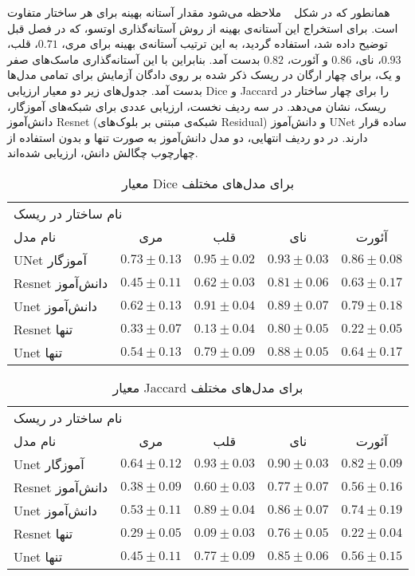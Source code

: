 همانطور که در شکل ~ ملاحظه‌ می‌شود مقدار آستانه بهینه برای هر ساختار متفاوت است. برای استخراج این آستانه‌ی بهینه از روش آستانه‌گذاری اوتسو، که در فصل قبل توضیح داده شد، استفاده گردید، به این ترتیب آستانه‌ی بهینه برای مری، $0.71$، قلب، $0.93$، نای، $0.86$ و آئورت، $0.82$ بدست آمد. بنابراین با این آستانه‌گذاری ماسک‌های صفر و یک، برای چهار ارگان در ریسک ذکر شده بر روی دادگان آزمایش برای تمامی مدل‌ها بدست آمد. جدول‌های زیر دو معیار ارزیابی Dice و Jaccard  را برای چهار ساختار در ریسک، نشان می‌دهد. در سه ردیف نخست، ارزیابی عددی برای شبکه‌های آموزگار، دانش‌آموز Resnet (شبکه‌ی مبتنی بر بلوک‌های Residual) و دانش‌آموز UNet ساده قرار دارند. در دو ردیف انتهایی، دو مدل دانش‌آموز به صورت تنها و بدون استفاده از چهارچوب چگالش دانش‌، ارزیابی شده‌اند.

\begin{table}[H]
	\caption{معیار Dice برای مدل‌های مختلف}
	\label{distilldice}
	\centering
	\begin{tabular}{lcccc}
		\toprule
		\multicolumn{4}{l}{نام ساختار در ریسک} \\
		
		\cmidrule(r){2-5}
		نام مدل & مری & قلب & نای & آئورت \\
		\midrule
		 UNet آموزگار & $0.73 \pm 0.13$ & $0.95 \pm 0.02$ & $0.93 \pm 0.03$ & $0.86 \pm 0.08$\\
		Resnet دانش‌آموز & $0.45 \pm 0.11$ & $0.62 \pm 0.03$ & $0.81 \pm 0.06$ & $0.63 \pm 0.17$ \\
		Unet دانش‌آموز & $0.62 \pm 0.13 $ & $0.91 \pm 0.04$ & $0.89 \pm 0.07 $ & $0.79 \pm 0.18$ \\
		\midrule
		Resnet تنها & $0.33 \pm 0.07 $ & $0.13 \pm 0.04 $ & $0.80 \pm 0.05$ & $0.22 \pm 0.05$ \\
		 Unet تنها & $0.54 \pm 0.13$ & $0.79 \pm 0.09$ & $0.88 \pm 0.05$ & $0.64 \pm 0.17$ \\
		\bottomrule
	\end{tabular}
\end{table}


\begin{table}[H]
	\caption{معیار Jaccard برای مدل‌های مختلف}
	\label{distilljaccard}
	\centering
	\begin{tabular}{lcccc}
		\toprule
		\multicolumn{4}{l}{نام ساختار در ریسک} \\
		
		\cmidrule(r){2-5}
		نام مدل & مری & قلب & نای & آئورت \\
		\midrule
		Unet آموزگار & $0.64 \pm 0.12$ & $0.93 \pm 0.03$ & $0.90 \pm 0.03$ & $0.82 \pm 0.09$\\
		Resnet دانش‌آموز & $0.38 \pm 0.09$ & $0.60 \pm 0.03$ & $0.77 \pm 0.07$ & $0.56 \pm 0.16$ \\
		Unet دانش‌آموز & $0.53 \pm 0.11 $ & $0.89 \pm 0.04$ & $0.86 \pm 0.07 $ & $0.74 \pm 0.19$ \\
		\midrule
		Resnet تنها & $0.29 \pm 0.05 $ & $0.09 \pm 0.03 $ & $0.76 \pm 0.05$ & $0.22 \pm 0.04$ \\
		Unet تنها & $0.45 \pm 0.11$ & $0.77 \pm 0.09$ & $0.85 \pm 0.06$ & $0.56 \pm 0.15$ \\
		\bottomrule
	\end{tabular}
\end{table}


